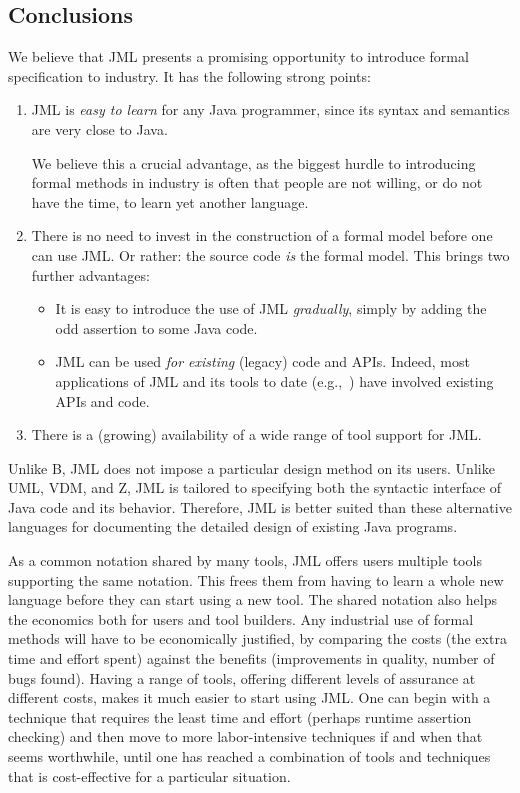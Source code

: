 \subsection{Conclusions}
\label{conclusions}

We believe that JML presents a promising opportunity to introduce
formal specification to industry.  It has the following strong points:

\begin{enumerate}
\item JML is {\em easy to learn} for any Java programmer, since its
  syntax and semantics are very close to Java.
  
  We believe this a crucial advantage, as the biggest hurdle to
  introducing formal methods in industry is often that people are not
  willing, or do not have the time, to learn yet another language.
  
\item There is no need to invest in the construction of a formal model
  before one can use JML\@. Or rather: the source code {\em is} the
  formal model.  This brings two further advantages:
  \begin{itemize}
  \item It is easy to introduce the use of JML {\em gradually}, simply
    by adding the odd assertion to some Java code.
  \item JML can be used {\em for existing} (legacy) code and APIs.
    Indeed, most applications of JML and its tools to date
    (e.g.,~\cite{BreunesseBJ02,CatanoHuisman02,PollBergJacobs01}) have
    involved existing APIs and code.
  \end{itemize}

\item There is a (growing) availability of a wide range of tool
      support for JML\@.
\end{enumerate}

Unlike B, JML does not impose a particular design method on its users.
Unlike UML, VDM, and Z, JML is tailored to specifying both the syntactic
interface of Java code and its behavior.
Therefore, JML is better suited than these alternative languages
for documenting the detailed design of existing Java programs.

\smallskip

As a common notation shared by many tools, JML offers users multiple
tools supporting the same notation.  This frees them from having to
learn a whole new language before they can start using a new tool.
The shared notation also helps the economics both for users and tool
builders.  Any industrial use of formal methods will have to be
economically justified, by comparing the costs (the extra time and
effort spent) against the benefits (improvements in quality, number of
bugs found).  Having a range of tools, offering different levels of
assurance at different costs, makes it much easier to start using JML\@.
One can begin with a technique that requires the least time and effort
(perhaps runtime assertion checking) and then move to more
labor-intensive techniques if and when that seems worthwhile, until
one has reached a combination of tools and techniques that is
cost-effective for a particular situation.

